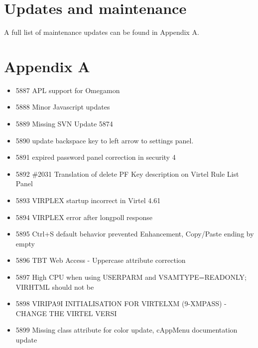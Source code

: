 \documentclass[letterpaper,10pt,english]{sphinxmanual}
\begin{document}
\chapter{Updates and maintenance}
\label{\detokenize{TN202101:updates-and-maintenance}}
A full list of maintenance updates can be found in Appendix A.

\newpage


\chapter{Appendix A}
\label{\detokenize{TN202101:appendix-a}}
\begin{itemize}
\item {} 
5887 APL support for Omegamon

\item {} 
5888 Minor Javascript updates

\item {} 
5889 Missing SVN Update 5874

\item {} 
5890 update backspace key to left arrow to settings panel.

\item {} 
5891 expired password panel correction in security 4

\item {} 
5892 \#2031 Translation of delete PF Key description on Virtel Rule List Panel

\item {} 
5893 VIRPLEX startup incorrect in Virtel 4.61

\item {} 
5894 VIRPLEX error after longpoll response

\item {} 
5895 Ctrl+S default behavior prevented Enhancement, Copy/Paste ending by empty

\item {} 
5896 TBT Web Access - Uppercase attribute correction

\item {} 
5897 High CPU when using USERPARM and VSAMTYPE=READONLY; VIRHTML should not be

\item {} 
5898 VIRIPA9I INITIALISATION FOR VIRTELXM (9-XMPASS) - CHANGE THE VIRTEL VERSI

\item {} 
5899 Missing class attribute for color update, cAppMenu documentation update


\end{itemize}
\end{document}
